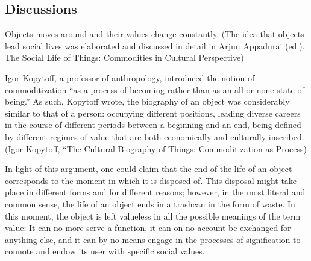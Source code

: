

\subsection{Discussions}
Objects moves around and their values change constantly. (The idea that objects lead social lives was elaborated and discussed in detail in Arjun Appadurai (ed.). The Social Life of Things: Commodities in Cultural Perspective)

Igor Kopytoff, a professor of anthropology, introduced the notion of commoditization “as a process of becoming rather than as an all-or-none state of being.” As such, Kopytoff wrote, the biography of an object was considerably similar to that of a person: occupying different positions, leading diverse careers in the course of different periods between a beginning and an end, being defined by different regimes of value that are both economically and culturally inscribed. (Igor Kopytoff, “The Cultural Biography of Things: Commoditization as Process)

In light of this argument, one could claim that the end of the life of an object corresponds to the moment in which it is disposed of. This disposal might take place in different forms and for different reasons; however, in the most literal and common sense, the life of an object ends in a trashcan in the form of waste. In this moment, the object is left valueless in all the possible meanings of the term value: It can no more serve a function, it can on no account be exchanged for anything else, and it can by no means engage in the processes of signification to connote and endow its user with specific social values.

